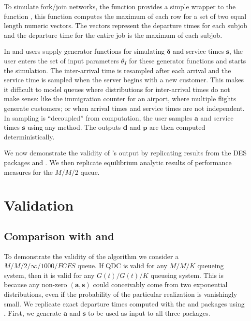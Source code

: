 \documentclass[article]{jss}
\begin{document}
To simulate fork/join networks, the  function  provides a simple wrapper to the  function , this function computes the maximum of each row for a set of two equal length numeric vectors. The vectors represent the departure times for each subjob and the departure time for the entire job is the maximum of each subjob. 

In  and  users supply generator functions for simulating $\mathbf{\delta}$ and service times $\mathbf{s}$, the user enters the set of input parameters $\theta_I$ for these generator functions and starts the simulation. The inter-arrival time is resampled after each arrival and the service time is sampled when the server begins with a new customer. This makes it difficult to model queues where distributions for inter-arrival times do not make sense: like the immigration counter for an airport, where multiple flights generate customers; or when arrival times and service times are not independent. In  sampling is ``decoupled'' from computation, the user samples $\mathbf{a}$ and service times $\mathbf{s}$ using any method. The outputs $\mathbf{d}$ and $\mathbf{p}$ are then computed deterministically. 

We now demonstrate the validity of 's output by replicating results from the DES packages  and . We then replicate equilibrium analytic results of performance measures for the $M/M/2$ queue. 

\section{Validation} \label{sec:Validation}

\subsection[Comparison with simmer and simpy]{Comparison with  and }

To demonstrate the validity of the algorithm we consider a $M/M/2/\infty/1000/FCFS$ queue. If QDC is valid for any $M/M/K$ queueing system, then it is valid for any $G(t)/G(t)/K$ queueing system. This is because any non-zero $\mathbf{(a,s)}$ could conceivably come from two exponential distributions, even if the probability of the particular realization is vanishingly small. We replicate exact departure times computed with the  and  packages using . First, we generate $\mathbf{a}$ and $\mathbf{s}$ to be used as input to all three packages. 
\end{document}
